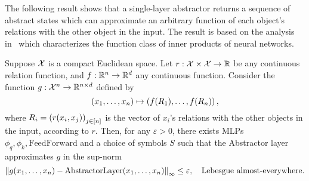 The following result shows that a single-layer abstractor returns a sequence of abstract states which can approximate an arbitrary function of each object's relations with the other object in the input. The result is based on the analysis in~\citep{altabaaApproximationRelationFunctions2024} which characterizes the function class of inner products of neural networks.

\begin{theorem}
    Suppose ${\mathcal{X}}$ is a compact Euclidean space. Let $r: {\mathcal{X}} \times {\mathcal{X}} \to \mathbb{R}$ be any continuous relation function, and $f: \mathbb{R}^n \to \mathbb{R}^d$ any continuous function. Consider the function $g: {\mathcal{X}}^n \to \mathbb{R}^{n \times d}$ defined by
    \begin{equation*}
        (x_1, \ldots, x_n) \mapsto \left(f(R_1), \ldots, f(R_n)\right),
    \end{equation*}
    where $R_i = {(r(x_i, x_j))}_{j \in [n]}$ is the vector of $x_i$'s relations with the other objects in the input, according to $r$. Then, for any $\varepsilon > 0$, there exists MLPs $\phi_q, \phi_k, \mathrm{FeedForward}$ and a choice of symbols $S$ such that the Abstractor layer approximates $g$ in the sup-norm
    \begin{equation*}
        \left\lVert g(x_1, \ldots, x_n) - \mathrm{AbstractorLayer}(x_1, \ldots, x_n)\right\rVert_{\infty} \leq \varepsilon, \quad \text{Lebesgue almost-everywhere.}
    \end{equation*}
\end{theorem}
